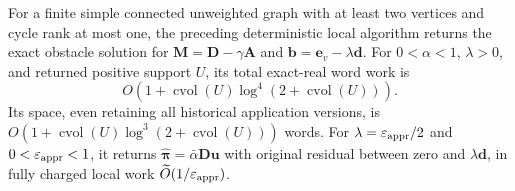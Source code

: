 \begin{theorem}
\label{thm:op3-local-unicyclic}
For a finite simple connected unweighted graph with at least two vertices
and cycle rank at most one, the preceding deterministic local algorithm
returns the exact obstacle solution for
$\boldsymbol M=\boldsymbol D-\gamma\boldsymbol A$ and
$\boldsymbol b=\boldsymbol e_v-\lambda\boldsymbol d$.
For $0<\alpha<1$, $\lambda>0$, and returned positive support $U$, its total
exact-real word work is
\[
 O\!\left(1+\operatorname{cvol}(U)
       \log^4(2+\operatorname{cvol}(U))\right).
\]
Its space, even retaining all historical application versions, is
$O(1+\operatorname{cvol}(U)\log^3(2+\operatorname{cvol}(U)))$ words.
For $\lambda=\varepsilon_{\mathrm{appr}}/2$ and $0<\varepsilon_{\mathrm{appr}}<1$, it returns
$\widehat{\boldsymbol\pi}=\bar\alpha\boldsymbol D\boldsymbol u$ with
original residual between zero and $\lambda\boldsymbol d$, in fully
charged local work $\widetilde O(1/\varepsilon_{\mathrm{appr}})$.
\end{theorem}
